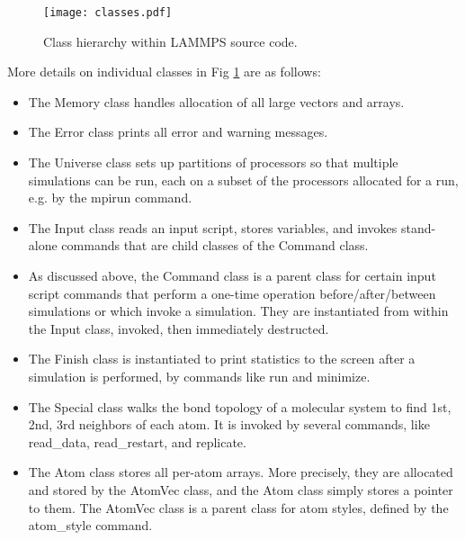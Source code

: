 \documentclass{article}
\begin{document}
\begin{figure}[htb]
 \begin{center}
 \texttt{[image: classes.pdf]}
 \end{center}
 \caption{Class hierarchy within LAMMPS source code.}
\label{fig:classes}
\end{figure}

More details on individual classes in Fig \ref{fig:classes} are as
follows:

\begin{itemize}

\item The Memory class handles allocation of all large vectors and
  arrays.

\item The Error class prints all error and warning messages.

\item The Universe class sets up partitions of processors so that
  multiple simulations can be run, each on a subset of the processors
  allocated for a run, e.g. by the mpirun command.

\item The Input class reads an input script, stores variables, and
  invokes stand-alone commands that are child classes of the Command
  class.

\item As discussed above, the Command class is a parent class for
  certain input script commands that perform a one-time operation
  before/after/between simulations or which invoke a simulation.  They
  are instantiated from within the Input class, invoked, then
  immediately destructed.

\item The Finish class is instantiated to print statistics to the
  screen after a simulation is performed, by commands like run and
  minimize.

\item The Special class walks the bond topology of a molecular system
  to find 1st, 2nd, 3rd neighbors of each atom.  It is invoked by
  several commands, like read\_data, read\_restart, and replicate.

\item The Atom class stores all per-atom arrays.  More precisely, they
  are allocated and stored by the AtomVec class, and the Atom class
  simply stores a pointer to them.  The AtomVec class is a parent
  class for atom styles, defined by the atom\_style command.


\end{itemize}
\end{document}
